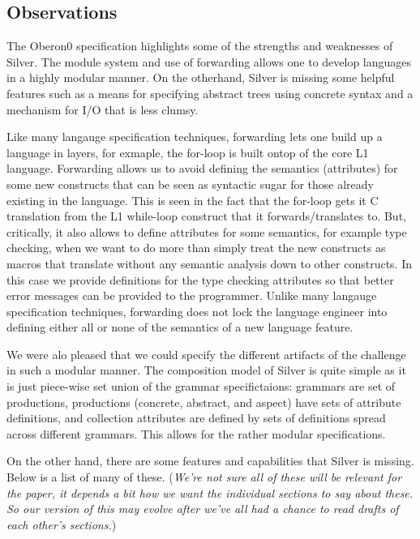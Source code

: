 \subsection{Observations}
\label{silver:sec:observations}

The Oberon0 specification highlights some of the strengths and
weaknesses of Silver.   The module system and use of forwarding allows
one to develop languages in a highly modular manner.   On the
otherhand, Silver is missing some helpful features such as a means for
specifying abstract trees using concrete syntax and a mechanism for
I/O that is less clumsy.

Like many langauge specification techniques, forwarding lets one build
up a language in layers, for exmaple, the for-loop is built ontop of
the core L1 language.  Forwarding allows us to avoid defining the
semantics (attributes) for some new constructs that can be seen as
syntactic sugar for those already existing in the language.  This is
seen in the fact that the for-loop gets it C translation from the L1
while-loop construct that it forwards/translates to.  But,
critically, it also allows to define attributes for some semantics,
for example type checking, when we want to do more than simply treat
the new constructs as macros that translate without any semantic
analysis down to other constructs.  In this case we provide
definitions for the type checking attributes so that better error
messages can be provided to the programmer.
%
Unlike many langauge specification techniques, forwarding does not
lock the language engineer into defining either all or none of the
semantics of a new language feature.

We were alo pleased that we could specify the different artifacts of
the challenge in such a modular manner.  The composition model of
Silver is quite simple as it is just piece-wise set union of the
grammar specifictaions: grammars are set of productions, productions
(concrete, abstract, and aspect) have sets of attribute definitions,
and collection attributes are defined by sets of definitions spread
across different grammars.  This allows for the rather modular
specifications. 


On the other hand, there are some features and capabilities that
Silver is missing.   Below is a list of many of these.  (\emph{We're
  not sure all of these will be relevant for the paper, it depends a
  bit how we want the individual sections to say about these.   So our
  version of this may evolve after we've all had a chance to read
  drafts of each other's sections.})

